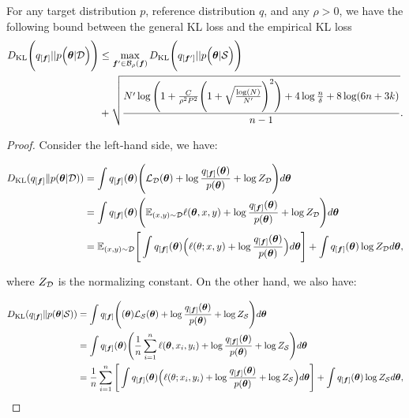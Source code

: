 \label{proof: pac-bayes}
\begin{theorem}
    For any target distribution $p$, reference distribution $q$, and any $\rho > 0$, we have the following bound between the general KL loss and the empirical KL loss
\begin{align*}
    D_{\mathrm{KL}}\Bigg(q_{[{\bm{f}}]} || p\Big({\bm{\theta}}|{\mathcal{D}}\Big)\Bigg) &\leq \max_{{\bm{f}}' \in {\mathcal{B}}_\rho({\bm{f}})}D_{\mathrm{KL}}\Bigg(q_{[{\bm{f}}']} || p\Big({\bm{\theta}} | {\mathcal{S}}\Big)\Bigg)\\
         &+ \sqrt{\frac{N' \log \Bigg(1 + \frac{C}{\rho^2 P^2}\Bigg(1+ \sqrt{\frac{\log(N)}{N'}}\Bigg)^2 \Bigg)+4\log\frac{n}{\delta}+8\log(6n+3k)}{n-1}}.\\
    \end{align*}
\end{theorem}

\begin{proof}

Consider the left-hand side, we have:

\begin{align*}
    D_{\mathrm{KL}}(q_{[{\bm{f}}]} \| p({\bm{\theta}}|{\mathcal{D}})) &= \int q_{[{\bm{f}}]}({\bm{\theta}})\Bigg({\mathcal{L}}_{\mathcal{D}}({\bm{\theta}})+\log \frac{q_{[{\bm{f}}]}({\bm{\theta}})}{p({\bm{\theta}})} + \log Z_{\mathcal{D}} \Bigg)d{\bm{\theta}}\\
    &=\int q_{[{\bm{f}}]}({\bm{\theta}})\Bigg(\mathbb{E}_{(x, y) \sim {\mathcal{D}}} \ell({\bm{\theta}}, x, y)+\log \frac{q_{[{\bm{f}}]}({\bm{\theta}})}{p({\bm{\theta}})} + \log Z_{\mathcal{D}}\Bigg)d{\bm{\theta}}\\
    &=\mathbb{E}_{(x, y)\sim {\mathcal{D}}}\Bigg[\int q_{[{\bm{f}}]}({\bm{\theta}})\Big(\ell(\theta; x, y)+\log\frac{q_{[{\bm{f}}]}({\bm{\theta}})}{p({\bm{\theta}})}\Big) d{\bm{\theta}} \Bigg] + \int q_{[{\bm{f}}]}({\bm{\theta}}) \log Z_{\mathcal{D}} d{\bm{\theta}},
\end{align*}

where $Z_{\mathcal{D}}$ is the normalizing constant.  On the other hand, we also have:

\begin{align*}
    D_{\mathrm{KL}}(q_{[{\bm{f}}]} \| p({\bm{\theta}}|{\mathcal{S}})) &= \int q_{[{\bm{f}}]}\Bigg(({\bm{\theta}}){\mathcal{L}}_{\mathcal{S}}({\bm{\theta}})+\log \frac{q_{[{\bm{f}}]}({\bm{\theta}})}{p({\bm{\theta}})}+\log Z_{\mathcal{S}}\Bigg) d{\bm{\theta}}\\
    &=\int q_{[{\bm{f}}]}({\bm{\theta}})\Bigg(\frac{1}{n}\sum_{i = 1}^n \ell({\bm{\theta}}, x_i, y_i)+\log \frac{q_{[{\bm{f}}]}({\bm{\theta}})}{p({\bm{\theta}})}+\log Z_{\mathcal{S}}\Bigg)d{\bm{\theta}}\\
    &=\frac{1}{n}\sum_{i=1}^n\Bigg[\int q_{[{\bm{f}}]}({\bm{\theta}})\Big(\ell(\theta; x_i, y_i)+\log\frac{q_{[{\bm{f}}]}({\bm{\theta}})}{p({\bm{\theta}})} + \log Z_{\mathcal{S}}\Big) d{\bm{\theta}} \Bigg] + \int q_{[{\bm{f}}]}({\bm{\theta}}) \log Z_{\mathcal{S}} d{\bm{\theta}},
\end{align*}


\end{proof}
